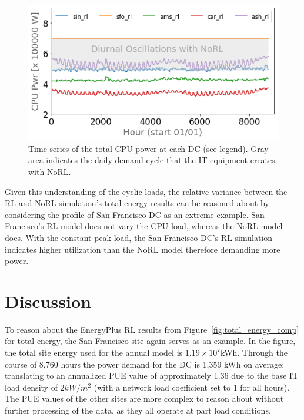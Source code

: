 \begin{figure}
  \centering
  \includegraphics[scale=0.45]{img/cpu_comps.png}
  \caption{Time series of the total CPU power at each DC (see legend). Gray area indicates the daily demand cycle that the IT equipment creates with NoRL.}
  \label{fig:cpu_comps}
  \end{figure}

  Given this understanding of the cyclic loads, the relative variance between the RL and NoRL simulation’s total energy results can be reasoned about by considering the profile of San Francisco DC as an extreme example. San Francisco’s RL model does not vary the CPU load, whereas the NoRL model does. With the constant peak load, the San Francisco DC’s RL simulation indicates higher utilization than the NoRL model therefore demanding more power.


\section{Discussion}
To reason about the EnergyPlus RL results from Figure~\ref{fig:total_energy_comp} for total energy, the San Francisco site again serves as an example. In the figure, the total site energy used for the annual model is $1.19 \times 10^7$kWh. Through the course of 8,760 hours the power demand for the DC is 1,359 kWh on average; translating to an annualized PUE value of approximately 1.36 due to the base IT load density of $2 kW/m^2$ (with a network load coefficient set to 1 for all hours). The PUE values of the other sites are more complex to reason about without further processing of the data, as they all operate at part load conditions.

